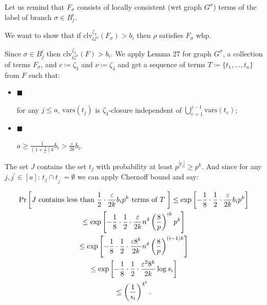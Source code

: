 Let us remind that $F_{\sigma}$ consists of locally consistent (wrt graph $G^{\sigma}$) terms of the
label of branch $\sigma\in B^{i}_{j}$.\par




We want to show that if $\mathrm{clv}_{G^{\sigma}}^{\zeta_{4}}\left(F_{\sigma}\right)>b_{i}$ then $\rho$ satisfies
$F_{\sigma}$ whp.\par




Since $\sigma\in B^{i}_{j}$ then $\mathrm{clv}_{G^{\sigma}}^{\zeta_{4}}\left(F\right)>b_{i}$. We apply Lemma
27 for graph $G^{\sigma}$, a collection of terms $F_{\sigma}$, and
$c\coloneqq\zeta_{3}$ and $\nu\coloneqq\zeta_{4}$ and get a sequence of terms
$T\coloneqq\{t_{1},\dots,t_{a}\}$ from $F$ such that:\par


\begin{itemize}


\item[] 
$\blacksquare$ 


for any $j\leq a$, $\mathrm{vars}(t_{j})$ is $\zeta_{4}$-closure independent of
$\bigcup\limits_{e=1}^{j-1}\mathrm{vars}(t_{e})$;\par





\item[] 
$\blacksquare$ 


$a\geq\frac{1}{(1+\frac{1}{\varepsilon})k}b_{i}>\frac{\varepsilon}{2k}b_{i}$.\par





\end{itemize}




The set $J$ contains the set $t_{j}$ with probability at least $p^{|t_{j}|}\geq p^{k}$. And since for
any $j,j^{\prime}\in[a]$: $t_{j}\cap t_{j^{\prime}}=\emptyset$ we can apply Chernoff bound and say:\par


\[\begin{gathered}
\displaystyle\Pr\left[J\text{ contains less than $\frac{1}{2}\cdot\frac{%
\varepsilon}{2k}b_{i}p^{k}$ terms of $T$ }\right] \displaystyle\leq\exp\left[-\frac{1}{8}\cdot\frac{1}{2}\cdot\frac{\varepsilon}%
{2k}b_{i}p^{k}\right] \\
\displaystyle\leq\exp\left[-\frac{1}{8}\cdot\frac{1}{2}\cdot\frac{\varepsilon}%
{2k}n^{\delta}\left(\frac{8}{p}\right)^{ik}p^{k}\right] \\
\displaystyle\leq\exp\left[-\frac{1}{8}\cdot\frac{1}{2}\cdot\frac{\varepsilon 8%
^{k}}{2k}n^{\delta}\left(\frac{8}{p}\right)^{(i-1)k}\right] \\
\displaystyle\leq\exp\left[-\frac{1}{8}\cdot\frac{1}{2}\cdot\frac{\varepsilon^%
{2}8^{k}}{2k}\log s_{i}\right] \\
\displaystyle\leq\left(\frac{1}{s_{i}}\right)^{4^{k}}.
\end{gathered}\]




